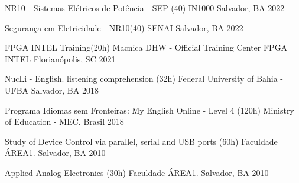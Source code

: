 

\begin{cvhonors}
\cvhonor
  {NR10 - Sistemas Elétricos de Potência - SEP (40)} %
  {IN1000} %
  {Salvador, BA} %
  {2022} %

\cvhonor
  {Segurança em Eletricidade - NR10(40)} %
  {SENAI} %
  {Salvador, BA} %
  {2022} %

\cvhonor
  {FPGA INTEL Training(20h)} %
  {Macnica DHW - Official Training Center FPGA INTEL} %
  {Florianópolis, SC} %
  {2021} %

\cvhonor
  {NucLi - English. listening comprehension (32h)} %
  {Federal University of Bahia - UFBA} %
  {Salvador, BA} %
  {2018} %
    
\cvhonor
  {Programa Idiomas sem Fronteiras: My English Online - Level 4 (120h) } %
  {Ministry of Education - MEC.} %
  {Brasil} %
  {2018} %

\cvhonor
  {Study of Device Control via parallel, serial and USB ports (60h)} %
  {Faculdade ÁREA1.} %
  {Salvador, BA} %
  {2010} %

\cvhonor
  {Applied Analog Electronics (30h)} %
  {Faculdade ÁREA1.} %
  {Salvador, BA} %
  {2010} %

\end{cvhonors}
